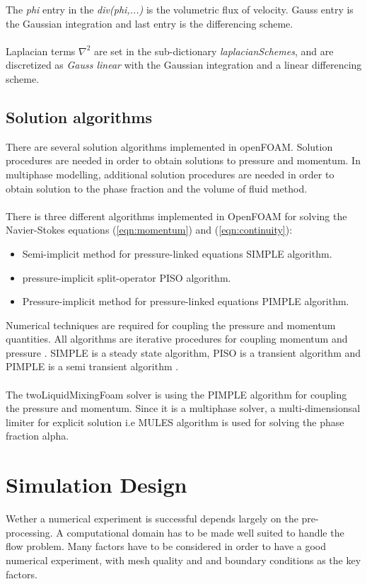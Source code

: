 \documentclass[a4paper, 12pt]{report}
\begin{document}
The \textit{phi} entry in the \textit{div(phi,...)} is the volumetric flux of velocity. Gauss entry is the Gaussian integration and last entry is the differencing scheme.\\
\\
Laplacian terms $\nabla^2$ are set in the sub-dictionary \textit{laplacianSchemes}, and are discretized as \textit{Gauss linear} with the Gaussian integration and a linear differencing scheme.
\section{Solution algorithms}
There are several solution algorithms implemented in openFOAM. Solution procedures are needed in order to obtain solutions to pressure and momentum. In multiphase modelling, additional solution procedures are needed in order to obtain solution to the phase fraction and the volume of fluid method.\\
\\
There is three different algorithms implemented in OpenFOAM for solving the Navier-Stokes equations (\ref{eqn:momentum}) and (\ref{eqn:continuity}):
\begin{itemize}
\item Semi-implicit method for pressure-linked equations SIMPLE algorithm.
\item pressure-implicit split-operator PISO algorithm.
\item Pressure-implicit method for pressure-linked equations PIMPLE algorithm.
\end{itemize}
Numerical techniques are required for coupling the pressure and momentum quantities.
All algorithms are iterative procedures for coupling momentum and pressure \cite{userGuide}. SIMPLE is a steady state algorithm, PISO is a transient algorithm and PIMPLE is a semi transient algorithm \cite{userGuide}.\\
\\
The twoLiquidMixingFoam solver is using the PIMPLE algorithm for coupling the pressure and momentum. Since it is a multiphase solver, a multi-dimensionsal limiter for explicit solution i.e MULES algorithm \cite{MULESopenFOAM} is used for solving the phase fraction alpha.
\chapter{Simulation Design}
Wether a numerical experiment is successful depends largely on the pre-processing. A computational domain has to be made well suited to handle the flow problem. Many factors have to be considered in order to have a good numerical experiment, with mesh quality and and boundary conditions as the key factors.
\end{document}
